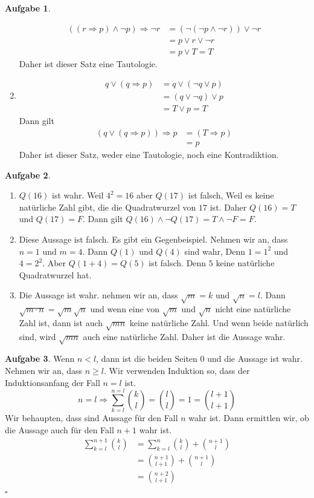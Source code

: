 \documentclass{article}
\theoremstyle{definition}
\newtheorem{ub}{Aufgabe}
\begin{document}
\begin{ub}
\begin{enumerate}
		\begin{align*}
			((r \Rightarrow p) \land \neg p) \Rightarrow \neg r & = 
			(\neg (\neg p \land \neg r)) \lor \neg r \\
			& = p \lor r \lor \neg r \\
			& = p \lor T = T
		\end{align*}
		Daher ist dieser Satz eine Tautologie.
		\item 
		\begin{align*}
			q \lor (q \Rightarrow p) & = q \lor (\neg q \lor p) \\
			& = (q \lor \neg q) \lor p \\
			& = T \lor p = T
		\end{align*}
		Dann gilt
		\begin{align*}
			(q \lor (q \Rightarrow p)) \Rightarrow p & = (T \Rightarrow p) \\
			& = p
		\end{align*}
		Daher ist dieser Satz, weder eine Tautologie, noch eine Kontradiktion.
	\end{enumerate}
\end{ub}
\begin{ub}
	\begin{enumerate}
		\item $ Q(16) $ ist wahr. Weil $ 4^2 = 16 $ aber $ Q(17) $ ist falsch, Weil es keine nat\"urliche Zahl gibt, die die Quadratwurzel von $ 17 $ ist. Daher $ Q(16) = T $ und $ Q(17) = F $. Dann gilt
		$ Q(16) \land \neg Q(17) = T \land \neg F = F $.
		\item 
		Diese Aussage ist falsch. Es gibt ein Gegenbeispiel. Nehmen wir an, dass $ n = 1 $ und $ m =4 $. Dann $ Q(1) $ und $ Q(4) $ sind wahr, Denn $ 1 = 1^2 $ und $ 4 = 2^2 $. Aber $ Q(1 + 4) = Q(5) $ ist falsch. Denn $ 5 $ keine nat\"urliche Quadratwurzel hat.
		\item 
		Die Aussage ist wahr. nehmen wir an, dass $ \sqrt{m} = k $ und $ \sqrt{n} = l $. Dann $ \sqrt{m\cdot n} = \sqrt{m} \sqrt{n} $ und wenn eine von $ \sqrt{m} $ und $ \sqrt{n} $ nicht eine nat\"urliche Zahl ist, dann ist auch $ \sqrt{mn} $ keine nat\"urliche Zahl. Und wenn beide nat\"urlich sind, wird $ \sqrt{mn} $ auch eine nat\"urliche Zahl. Daher ist die Aussage wahr.
	\end{enumerate}
\end{ub}
\begin{ub}
	Wenn $ n < l $, dann ist die beiden Seiten $ 0 $ und die Aussage ist wahr. Nehmen wir an, dass $ n \geq l $. Wir verwenden Induktion so, dass der Induktionsanfang der Fall $ n = l $ ist. 
	\[ 
	n = l \Rightarrow \sum\limits_{k=l}^{n = l} {k \choose l} = {l \choose l} = 1 = {l + 1 \choose l + 1}
	 \]
	Wir behaupten, dass sind Aussage für den Fall $ n $ wahr ist. Dann ermittlen wir, ob die Aussage auch f\"ur den Fall $ n + 1$ wahr ist.
	\begin{align*}
		\sum\limits_{k=l}^{n+1} {k \choose l} & = \sum\limits_{k=l}^n {k \choose l} + {n+1 \choose l} \\
		& = {n+1 \choose l+1} + {n + 1 \choose l} \\
		& = {n+2 \choose l+1}
	\end{align*} \hfill$ \square $
 \end{ub}
\end{document}
